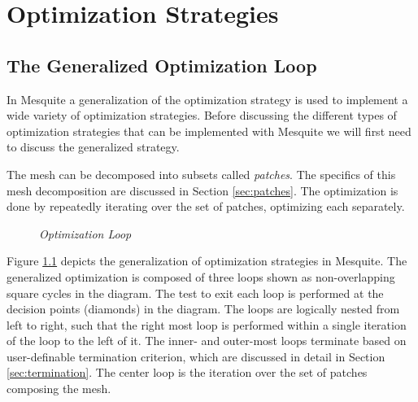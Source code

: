 \chapter{Optimization Strategies \label{ch:optstrat}}

\section{The Generalized Optimization Loop}

In Mesquite a generalization of the optimization strategy is used to implement a wide variety of optimization strategies.  Before discussing the different types of optimization strategies that can be implemented with Mesquite we will first need to discuss the generalized strategy.

The mesh can be decomposed into subsets called {\em patches}.  The specifics of this mesh decomposition are discussed in Section \ref{sec:patches}.  The optimization is done by repeatedly iterating over the set of patches, optimizing each separately.

\begin{figure}[htb!]
\begin{center}
\noindent{}
\caption{\em Optimization Loop \label{fig:genoptloop}}
\end{center}
\end{figure}

Figure \ref{fig:genoptloop} depicts the generalization of optimization strategies in Mesquite.  The generalized optimization is composed of three loops shown as non-overlapping square cycles in the diagram.  The test to exit each loop is performed at the decision points (diamonds) in the diagram.  The loops are logically nested from left to right, such that the right most loop is performed within a single iteration of the loop to the left of it.  The inner- and outer-most loops terminate based on user-definable termination criterion, which are discussed in detail in Section \ref{sec:termination}.  The center loop is the iteration over the set of patches composing the mesh.

